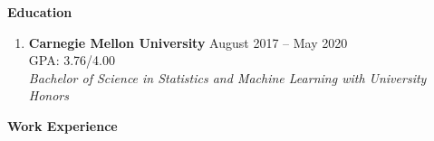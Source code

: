 \documentclass[letterpaper,11pt]{article}
\makeatletter
\newlength{\outerbordwidth}
\newcommand{\resheading}[1]{\vspace{0pt} %
  \parbox{\textwidth}{\setlength{\FrameSep}{\outerbordwidth}
    \begin{shaded}
\setlength{\fboxsep}{0pt}\framebox[\textwidth][l]{\setlength{\fboxsep}{3.5pt}\fcolorbox{shadecolorB}{shadecolorB}{\textbf{\sffamily{\mbox{~}\makebox[7.262in][l]{\large #1} \vphantom{p\^{E}}}}}} %
    \end{shaded}
  }\vspace{-7pt} %
}
\newcommand{\ressubheading}[5]{
\begin{tabular*}{6.8in}{l@{\cftdotfill{\cftsecdotsep}\extracolsep{\fill}}r}
		\textbf{#1} & {#2} \\
		{#3} \\
		\textit{#4} \\
		\textit{#5} \\
\end{tabular*}\vspace{-6pt}}
\makeatother
\begin{document}
\vspace{-0.18in}

\begin{mybox}
	\hspace{-8pt} \textbf{Education}
\end{mybox}


\vspace{-10pt}
\begin{enumerate}[leftmargin=10pt]

	\item[] \textbf{Carnegie Mellon University} \cftdotfill{\cftdotsep} August 2017 -- May 2020\\
	GPA: 3.76/4.00 \\
	\textit{Bachelor of Science in Statistics and Machine Learning with University Honors} \\
	\vspace{-0.3pt}
	
\end{enumerate}

\vspace{-10pt}

\begin{mybox}
	\hspace{-8pt} \textbf{Work Experience}
\end{mybox}
\end{document}
